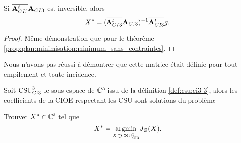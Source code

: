     \begin{prop}
      \label{prop:cylindre:minimisation:minimum_sans_contraintes}
      Si \(\conj{\mA_{CI3}^t}\mA_{CI3}\) est inversible, alors
      \begin{equation*}
        X^* = (\conj{\mA_{CI3}^t}\mA_{CI3})^{-1}\conj{\mA_{CI3}^t}g.
      \end{equation*}
    \end{prop}

    \begin{proof}
      Même démonstration que pour le théorème \ref{prop:plan:minimisation:minimum_sans_contraintes}.
    \end{proof}

    Nous n'avons pas réussi à démontrer que cette matrice était définie pour tout empilement et toute incidence.

    \begin{thm}

      Soit \(\CSU[3]{CI3}\) le sous-espace de \(\CC^5\) issu de la définition \ref{def:csu:ci3-3},
      alors les coefficients de la CIOE respectant les CSU sont solutions du problème

      Trouver \(X^* \in \CC^5\) tel que
      \begin{equation*}
        X^* = \argmin{X\in \CSU[3]{CI3}}  J_Z(X).
      \end{equation*}
    \end{thm}

